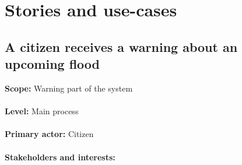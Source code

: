 \section{Stories and use-cases}
\subsection{A citizen receives a warning about an upcoming flood}
\textbf{Scope:} Warning part of the system\\\\
\textbf{Level:} Main process\\\\
\textbf{Primary actor:} Citizen\\\\
\textbf{Stakeholders and interests:}\\


